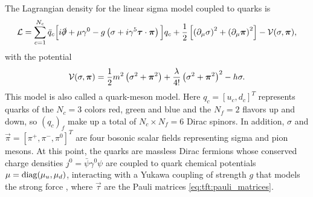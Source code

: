 The Lagrangian density for the linear sigma model coupled to quarks is
\begin{equation}
	\mathcal{L} = \sum_{c=1}^{N_c} \bar{q}_c \Big[ i \slashed\partial + \mu \gamma^0 - g \left( \sigma + i \gamma^5 {\bm{\tau}} \cdot {\bm{\pi}} \right) \Big] q_c
	      + \frac12 \left[ \left( \partial_\mu \sigma \right)^2 + \left( \partial_\mu {\bm{\pi}} \right)^2 \right] - \mathcal{V}(\sigma,{\bm{\pi}}) ,
\label{eq:lsm:lagrangian}
\end{equation}
with the potential
\begin{equation}
	\mathcal{V}(\sigma,{\bm{\pi}}) = \frac12 m^2 \left( \sigma^2 + {\bm{\pi}}^2 \right) + \frac{\lambda}{4!} \left( \sigma^2 + {\bm{\pi}}^2 \right)^2 - h \sigma .
\label{eq:lsm:potential}
\end{equation}
This model is also called a quark-meson model.
Here $q_c = [u_c, d_c]^T$ represents quarks of the $N_c = 3$ colors red, green and blue and the $N_f = 2$ flavors up and down, so $(q_c)_f$ make up a total of $N_c \times N_f = 6$ Dirac spinors.
In addition, $\sigma$ and $\vec\pi = [\pi^+, \pi^-, \pi^0]^T$ are four bosonic scalar fields representing sigma and pion mesons.
At this point, the quarks are massless Dirac fermions whose conserved charge densities $j^0 = \bar\psi \gamma^0 \psi$ are coupled to quark chemical potentials $\mu = \operatorname{diag}(\mu_u, \mu_d)$, interacting with a Yukawa coupling of strength $g$ that models the strong force , where $\vec\tau$ are the Pauli matrices \eqref{eq:tft:pauli_matrices}.

